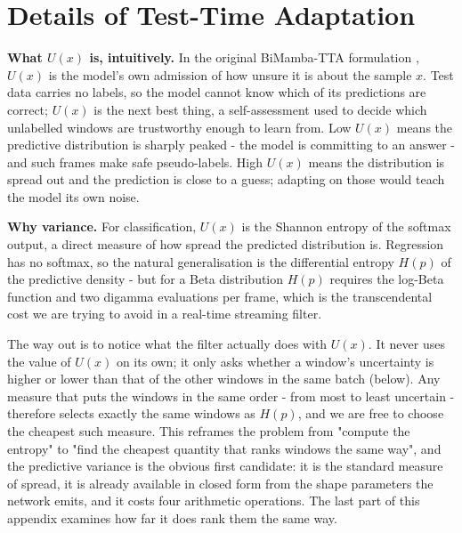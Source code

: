 \documentclass[10pt,a4paper,twocolumn]{article}
\begin{document}
	\section{Details of Test-Time Adaptation}
	\label{app:ttadetails}
	\textbf{What $U(x)$ is, intuitively.} In the original BiMamba-TTA formulation \cite{ziyu2025}, $U(x)$ is the model's own admission of how unsure it is about the sample $x$. Test data carries no labels, so the model cannot know which of its predictions are correct; $U(x)$ is the next best thing, a self-assessment used to decide which unlabelled windows are trustworthy enough to learn from. Low $U(x)$ means the predictive distribution is sharply peaked - the model is committing to an answer - and such frames make safe pseudo-labels. High $U(x)$ means the distribution is spread out and the prediction is close to a guess; adapting on those would teach the model its own noise.

	\textbf{Why variance.} For classification, $U(x)$ is the Shannon entropy of the softmax output, a direct measure of how spread the predicted distribution is. Regression has no softmax, so the natural generalisation is the differential entropy $H(p)$ of the predictive density - but for a Beta distribution $H(p)$ requires the log-Beta function and two digamma evaluations per frame, which is the transcendental cost we are trying to avoid in a real-time streaming filter.

	The way out is to notice what the filter actually does with $U(x)$. It never uses the value of $U(x)$ on its own; it only asks whether a window's uncertainty is higher or lower than that of the other windows in the same batch (below). Any measure that puts the windows in the same order - from most to least uncertain - therefore selects exactly the same windows as $H(p)$, and we are free to choose the cheapest such measure. This reframes the problem from "compute the entropy" to "find the cheapest quantity that ranks windows the same way", and the predictive variance is the obvious first candidate: it is the standard measure of spread, it is already available in closed form from the shape parameters the network emits, and it costs four arithmetic operations. The last part of this appendix examines how far it does rank them the same way.
\end{document}
